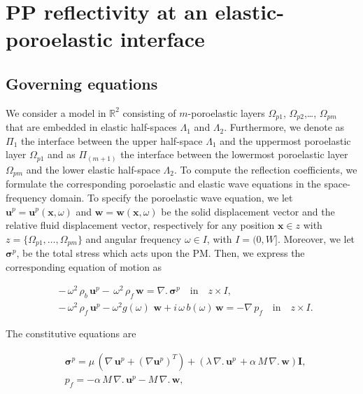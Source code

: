\documentclass[draft]{agujournal2019}
\begin{document}
\appendix
\section{PP reflectivity  at an elastic-poroelastic interface}

\subsection{Governing equations}
We consider a model in $\mathbb R^2$ consisting of 
$m$-poroelastic layers  $\Omega_{p1}$,  $\Omega_{p2}$,\dots, $\Omega_{pm}$ that are embedded in elastic half-spaces $\Lambda_1$ and $\Lambda_2$. Furthermore, we denote as $\Pi_1$  the interface between the upper half-space $\Lambda_1$ and the uppermost poroelastic layer $\Omega_{p1}$ and as $\Pi_{(m+1)}$ the interface between the lowermost poroelastic layer $\Omega_{pm}$ and the lower elastic half-space $\Lambda_2$. To compute the  reflection coefficients, we formulate the corresponding poroelastic and elastic wave equations in the space-frequency domain. To specify the poroelastic wave equation,  we let $\bm{u}^p =\bm{u}^p( \bm{x}, \omega)$ and $\bm{w} =\bm{w}( \bm{x}, \omega)$  be the solid displacement vector and the relative fluid displacement vector, respectively for any position $\bm{x} \in z$ with $z=\{\Omega_{p1},\dots,\Omega_{pm}\}$  and angular frequency $\omega \in I$, with $I =(0,W]$. Moreover, we let $\bm {\sigma}^p$, be the total stress which acts upon the PM. Then, we express the corresponding equation of motion as
\begin{linenomath*}
\begin{equation}\label{Eq.a1}
\begin{split}
& -\,\omega^2  \, \rho_b  \, \bm{u}^p -  \,\omega^2 \, \rho_f \, \bm{w}= \nabla . \, \bm{\sigma}^p \quad  \textrm{in} \quad z \times I, \\
& -\,\omega^2  \, \rho_f \, \bm{u}^p - \omega^2 g(\omega) \, \, \bm{w} + i \, \omega \, b(\omega) \, \bm{w} = - \nabla \, p_f \quad  \textrm{in} \quad z \times I.
\end{split}
\end{equation}
\end{linenomath*}
The constitutive equations are
\begin{linenomath*}
\begin{equation}\label{Eq.a2}
\begin{split}
& \bm{\sigma}^p = \mu \,  \left( \nabla \,\bm{u}^p + ({\nabla  \bm{u}^p})^T  \right) +  \left( \lambda \, \nabla . \, \bm{u}^p\, + \alpha \,M \, \nabla . \, \bm{w} \right) \bm{I}, \\
&p_f=- \alpha \, M \, \nabla . \, \bm{u}^p - M \, \nabla . \, \bm{w},  \end{split}
\end{equation}
\end{linenomath*}
\end{document}
